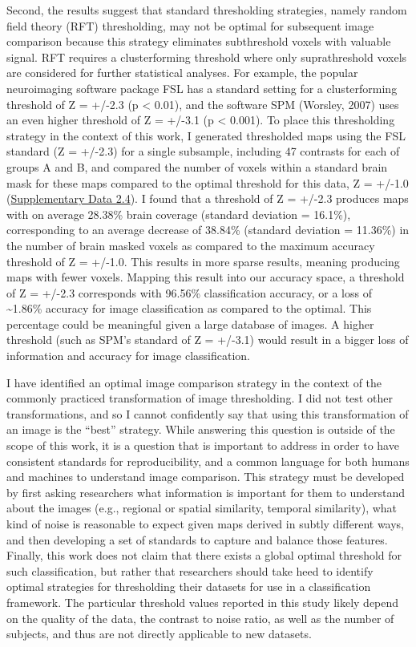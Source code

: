 \documentclass{report}
\begin{document}
Second, the results suggest that standard thresholding strategies,
namely random field theory (RFT) thresholding, may not be optimal for
subsequent image comparison because this strategy eliminates
subthreshold voxels with valuable signal. RFT requires a clusterforming
threshold where only suprathreshold voxels are considered for further
statistical analyses. For example, the popular neuroimaging software
package FSL \cite{Jenkinson2012-pr} has
a standard setting for a clusterforming threshold of Z = +/-2.3 (p
\textless{} 0.01), and the software SPM (Worsley, 2007) uses an even
higher threshold of Z = +/-3.1 (p \textless{} 0.001). To place this
thresholding strategy in the context of this work, I generated
thresholded maps using the FSL standard (Z = +/-2.3) for a single
subsample, including 47 contrasts for each of groups A and B, and
compared the number of voxels within a standard brain mask for these
maps compared to the optimal threshold for this data, Z = +/-1.0
(\href{https://github.com/vsoch/thesis/blob/master/supplementary/chapter2/supp_data4_voxel_counts_rft_vs_thresh.csv}{Supplementary Data 2.4}). I found that a threshold of Z = +/-2.3 produces
maps with on average 28.38\% brain coverage (standard deviation =
16.1\%), corresponding to an average decrease of 38.84\% (standard
deviation = 11.36\%) in the number of brain masked voxels as compared to
the maximum accuracy threshold of Z = +/-1.0. This results in more sparse
results, meaning producing maps with fewer voxels. Mapping this result
into our accuracy space, a threshold of Z = +/-2.3 corresponds with
96.56\% classification accuracy, or a loss of \textasciitilde{}1.86\%
accuracy for image classification as compared to the optimal. This
percentage could be meaningful given a large database of images. A
higher threshold (such as SPM's standard of Z = +/-3.1) would result in a
bigger loss of information and accuracy for image classification.

I have identified an optimal image comparison strategy in the context of
the commonly practiced transformation of image thresholding. I did not
test other transformations, and so I cannot confidently say that using
this transformation of an image is the ``best'' strategy. While
answering this question is outside of the scope of this work, it is a
question that is important to address in order to have consistent
standards for reproducibility, and a common language for both humans and
machines to understand image comparison. This strategy must be developed
by first asking researchers what information is important for them to
understand about the images (e.g., regional or spatial similarity,
temporal similarity), what kind of noise is reasonable to expect given
maps derived in subtly different ways, and then developing a set of
standards to capture and balance those features. Finally, this work does
not claim that there exists a global optimal threshold for such
classification, but rather that researchers should take heed to identify
optimal strategies for thresholding their datasets for use in a
classification framework. The particular threshold values reported in
this study likely depend on the quality of the data, the contrast to
noise ratio, as well as the number of subjects, and thus are not
directly applicable to new datasets.
\end{document}
